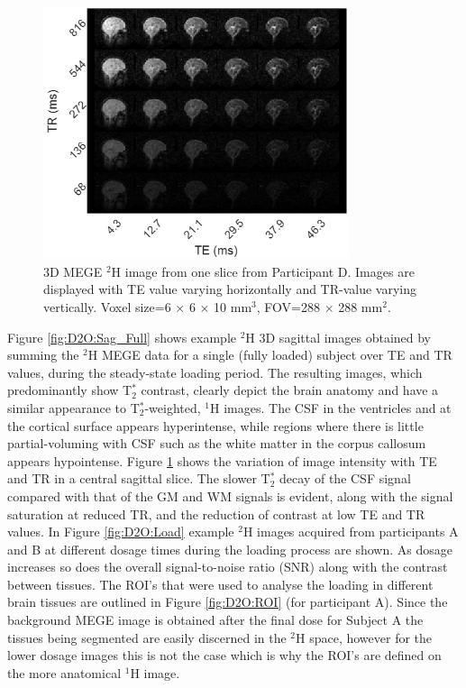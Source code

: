 \documentclass[class=article, crop=false]{standalone}
\begin{document}
\begin{figure}
    \centering
    \includegraphics[width = 0.8\textwidth]{Figures/D2O/TR_TE.png}
    \caption{3D MEGE $^2$H image from one slice from Participant D. Images are displayed with TE value varying horizontally and TR-value varying vertically. Voxel size=6 × 6 × 10 mm$^3$, FOV=288 × 288 mm$^2$.}
    \label{fig:D2O:TR_TE}
\end{figure}

Figure \ref{fig:D2O:Sag_Full} shows example $^2$H 3D sagittal images obtained by summing the $^2$H MEGE data for a single (fully loaded) subject over TE and TR values, during the steady-state loading period. The resulting images, which predominantly show T$_2^*$ contrast, clearly depict the brain anatomy and have a similar appearance to T$_2^*$-weighted, $^1$H images. The CSF in the ventricles and at the cortical surface appears hyperintense, while regions where there is little partial-voluming with CSF such as the white matter in the corpus callosum appears hypointense. Figure \ref{fig:D2O:TR_TE} shows the variation of image intensity with TE and TR in a central sagittal slice. The slower T$_2^*$ decay of the CSF signal compared with that of the GM and WM signals is evident, along with the signal saturation at reduced TR, and the reduction of contrast at low TE and TR values. In Figure \ref{fig:D2O:Load} example $^2$H images acquired from participants A and B at different dosage times during the loading process are shown. As dosage increases so does the overall signal-to-noise ratio (SNR) along with the contrast between tissues. The ROI’s that were used to analyse the loading in different brain tissues are outlined in Figure \ref{fig:D2O:ROI} (for participant A). Since the background MEGE image is obtained after the final dose for Subject A the tissues being segmented are easily discerned in the $^2$H space, however for the lower dosage images this is not the case which is why the ROI’s are defined on the more anatomical $^1$H image. 
\end{document}
